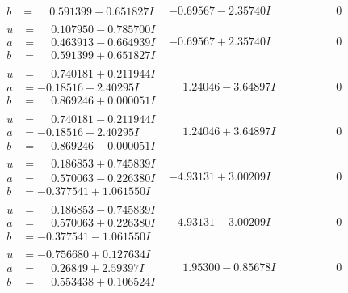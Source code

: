 \documentclass[1p]{elsarticle_modified}
\theoremstyle{definition}
\begin{document}
$$\begin{array}{c|c|c}
\begin{aligned}
b &= \phantom{-}0.591399 - 0.651827 I\end{aligned}
 & -0.69567 - 2.35740 I & \phantom{-0.000000 } 0 \\ \hline\begin{aligned}
u &= \phantom{-}0.107950 - 0.785700 I \\
a &= \phantom{-}0.463913 - 0.664939 I \\
b &= \phantom{-}0.591399 + 0.651827 I\end{aligned}
 & -0.69567 + 2.35740 I & \phantom{-0.000000 } 0 \\ \hline\begin{aligned}
u &= \phantom{-}0.740181 + 0.211944 I \\
a &= -0.18516 - 2.40295 I \\
b &= \phantom{-}0.869246 + 0.000051 I\end{aligned}
 & \phantom{-}1.24046 - 3.64897 I & \phantom{-0.000000 } 0 \\ \hline\begin{aligned}
u &= \phantom{-}0.740181 - 0.211944 I \\
a &= -0.18516 + 2.40295 I \\
b &= \phantom{-}0.869246 - 0.000051 I\end{aligned}
 & \phantom{-}1.24046 + 3.64897 I & \phantom{-0.000000 } 0 \\ \hline\begin{aligned}
u &= \phantom{-}0.186853 + 0.745839 I \\
a &= \phantom{-}0.570063 - 0.226380 I \\
b &= -0.377541 + 1.061550 I\end{aligned}
 & -4.93131 + 3.00209 I & \phantom{-0.000000 } 0 \\ \hline\begin{aligned}
u &= \phantom{-}0.186853 - 0.745839 I \\
a &= \phantom{-}0.570063 + 0.226380 I \\
b &= -0.377541 - 1.061550 I\end{aligned}
 & -4.93131 - 3.00209 I & \phantom{-0.000000 } 0 \\ \hline\begin{aligned}
u &= -0.756680 + 0.127634 I \\
a &= \phantom{-}0.26849 + 2.59397 I \\
b &= \phantom{-}0.553438 + 0.106524 I\end{aligned}
 & \phantom{-}1.95300 - 0.85678 I & \phantom{-0.000000 } 0 \\ \hline\begin{aligned}

\end{aligned}
\end{array}$$
\end{document}

